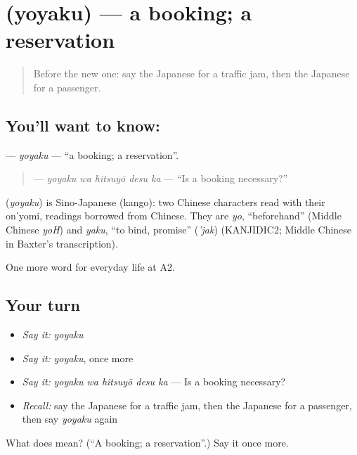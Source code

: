 \section[\texorpdfstring{\ja{よやく} (yoyaku)}{よやく (yoyaku)}]{ (yoyaku) — a booking; a reservation}

\label{lesson:JA-C206-yoyaku}



\begin{quote}
Before the new one: say the Japanese for a traffic jam, then the Japanese for a passenger.
\end{quote}

\subsection*{You'll want to know: }
\textbf{} — \emph{yoyaku} — \textquotedblleft{}a booking; a reservation\textquotedblright{}.

\begin{quote}
\textbf{ } — \emph{yoyaku wa hitsuyō desu ka} — \textquotedblleft{}Is a booking necessary?\textquotedblright{}
\end{quote}

\begin{cousinweb}
\textbf{} (\emph{yoyaku}) is Sino-Japanese (kango): two Chinese characters read with their on'yomi, readings borrowed from Chinese. They are \emph{yo}, \textquotedblleft{}beforehand\textquotedblright{} (Middle Chinese \emph{yoH}) and \emph{yaku}, \textquotedblleft{}to bind, promise\textquotedblright{} (\emph{'jak}) (KANJIDIC2; Middle Chinese in Baxter's transcription).
\end{cousinweb}

\begin{grammarlens}[title={What you've built}]
One more word for everyday life at A2.
\end{grammarlens}

\subsection*{Your turn}
\begin{itemize}
\raggedright
  \item \emph{Say it:} \emph{yoyaku}
  \item \emph{Say it:} \emph{yoyaku}, once more
  \item \emph{Say it:} \emph{yoyaku wa hitsuyō desu ka} — Is a booking necessary?
  \item \emph{Recall:} say the Japanese for a traffic jam, then the Japanese for a passenger, then say \emph{yoyaku} again
\end{itemize}

\begin{tcolorbox}[breakable,colback=teal!4,colframe=teal!35!black,title={Before you move on}]
What does  mean? (\textquotedblleft{}A booking; a reservation\textquotedblright{}.) Say it once more.
\end{tcolorbox}
